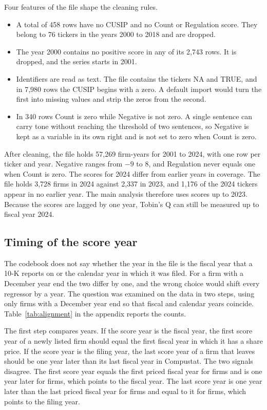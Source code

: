 \documentclass[12pt,a4paper]{article}
\begin{document}
Four features of the file shape the cleaning rules.

\begin{itemize}
\item A total of 458 rows have no CUSIP and no Count or Regulation score. They belong to 76 tickers in the years 2000 to 2018 and are dropped.
\item The year 2000 contains no positive score in any of its 2,743 rows. It is dropped, and the series starts in 2001.
\item Identifiers are read as text. The file contains the tickers NA and TRUE, and in 7,980 rows the CUSIP begins with a zero. A default import would turn the first into missing values and strip the zeros from the second.
\item In 340 rows Count is zero while Negative is not zero. A single sentence can carry tone without reaching the threshold of two sentences, so Negative is kept as a variable in its own right and is not set to zero when Count is zero.
\end{itemize}

After cleaning, the file holds 57,269 firm-years for 2001 to 2024, with one row per ticker and year. Negative ranges from $-9$ to 8, and Regulation never equals one when Count is zero. The scores for 2024 differ from earlier years in coverage. The file holds 3,728 firms in 2024 against 2,337 in 2023, and 1,176 of the 2024 tickers appear in no earlier year. The main analysis therefore uses scores up to 2023. Because the scores are lagged by one year, Tobin's Q can still be measured up to fiscal year 2024.

\subsection{Timing of the score year}

The codebook does not say whether the year in the file is the fiscal year that a 10-K reports on or the calendar year in which it was filed. For a firm with a December year end the two differ by one, and the wrong choice would shift every regressor by a year. The question was examined on the data in two steps, using only firms with a December year end so that fiscal and calendar years coincide. Table~\ref{tab:alignment} in the appendix reports the counts.

The first step compares years. If the score year is the fiscal year, the first score year of a newly listed firm should equal the first fiscal year in which it has a share price. If the score year is the filing year, the last score year of a firm that leaves should be one year later than its last fiscal year in Compustat. The two signals disagree. The first score year equals the first priced fiscal year for \entryZero{} firms and is one year later for \entryOne{} firms, which points to the fiscal year. The last score year is one year later than the last priced fiscal year for \exitOne{} firms and equal to it for \exitZero{} firms, which points to the filing year.
\end{document}
